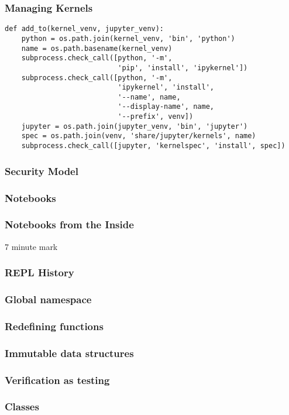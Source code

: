 \begin{frame}[fragile]
\frametitle{Managing Kernels}

\begin{lstlisting}
def add_to(kernel_venv, jupyter_venv):
    python = os.path.join(kernel_venv, 'bin', 'python')
    name = os.path.basename(kernel_venv)
    subprocess.check_call([python, '-m',
                           'pip', 'install', 'ipykernel'])
    subprocess.check_call([python, '-m',
                           'ipykernel', 'install',
                           '--name', name,
                           '--display-name', name,
                           '--prefix', venv])
    jupyter = os.path.join(jupyter_venv, 'bin', 'jupyter')
    spec = os.path.join(venv, 'share/jupyter/kernels', name)
    subprocess.check_call([jupyter, 'kernelspec', 'install', spec])
\end{lstlisting}
\end{frame}

\begin{frame}
\frametitle{Security Model}
\end{frame}

\begin{frame}
\frametitle{Notebooks}
\end{frame}

\begin{frame}
\frametitle{Notebooks from the Inside}
\end{frame}

7 minute mark

\begin{frame}
\frametitle{REPL History}
\end{frame}

\begin{frame}
\frametitle{Global namespace}
\end{frame}

\begin{frame}
\frametitle{Redefining functions}
\end{frame}

\begin{frame}
\frametitle{Immutable data structures}
\end{frame}

\begin{frame}
\frametitle{Verification as testing}
\end{frame}

\begin{frame}
\frametitle{Classes}
\end{frame}

